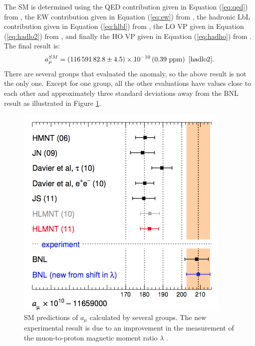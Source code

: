 \documentclass{outhesis}
\begin{document}
The SM is determined using the QED contribution given in Equation (\ref{eq:qed}) from \cite{qed}, the EW contribution given in Equation (\ref{eq:ew}) from \cite{ew}, the hadronic LbL contribution given in Equation (\ref{eq:hlbl}) from \cite{hlbl}, the LO VP given in Equation (\ref{eq:hadlo2}) from  \cite{hadlo2}, and finally the HO VP given in Equation (\ref{eq:hadho}) from \cite{hadlo2}. The final result is:
\begin{equation}
a_{\mu}^{SM} = \left(116\, 591\, 82.8 \pm 4.5\right) \times 10^{-10} \left(0.39  \text{ ppm}\right)  \,\,\cite{hadlo2}.
\label{eq:sm}
\end{equation}
There are several groups that evaluated the anomaly, so the above result is not the only one. Except for one group, all the other evaluations have values close to each other and approximately three standard deviations away from the BNL result as illustrated in Figure \ref{fig:smex}.
\begin{figure}
  \centering
  \includegraphics[scale=0.5]{figures/smex}
   \caption[Different SM predictions of $a_{\mu}$]{SM predictions of $a_{\mu}$ calculated by several groups. The new experimental result is due to an improvement in the measurement of the muon-to-proton magnetic moment ratio $\lambda$ \cite{hadlo2}.}
  \label{fig:smex}
\end{figure}
\end{document}
